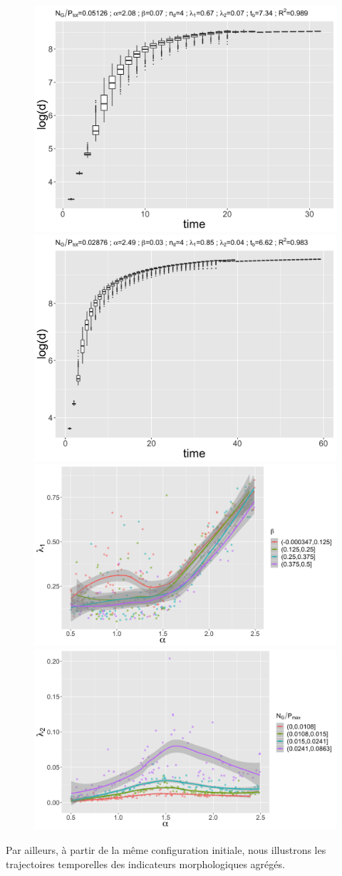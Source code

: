 \documentclass[11pt]{article}
\begin{document}
\begin{figure}
	\includegraphics[width=0.49\linewidth]{figures/configdist_boxplot_id3642.png}
	\includegraphics[width=0.49\linewidth]{figures/configdist_boxplot_id3784.png}
	\includegraphics[width=0.49\linewidth]{figures/lambda1_alpha_colbeta.png}
	\includegraphics[width=0.49\linewidth]{figures/lambda2_alpha_colrelgrowthrate.png}
	\caption{}
	\label{fig:lyapounov}
\end{figure}

Par ailleurs, à partir de la même configuration initiale, nous illustrons les trajectoires temporelles des indicateurs morphologiques agrégés.



\begin{figure}
	
	\caption{}
	\label{fig:morphotraj}
\end{figure}
\end{document}
